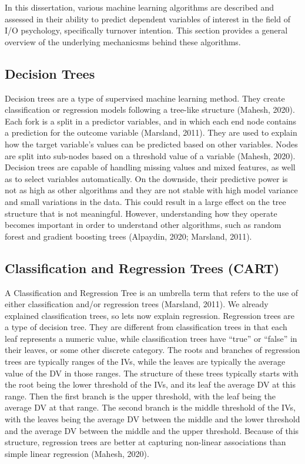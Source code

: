 \documentclass[
  man]{apa7}
\begin{document}
In this dissertation, various machine learning algorithms are described and assessed in their ability to predict dependent variables of interest in the field of I/O psychology, specifically turnover intention.
This section provides a general overview of the underlying mechanicsms behind these algorithms.

\hypertarget{decision-trees}{%
\subsection{Decision Trees}\label{decision-trees}}

Decision trees are a type of supervised machine learning method.
They create classification or regression models following a tree-like structure (Mahesh, 2020).
Each fork is a split in a predictor variables, and in which each end node contains a prediction for the outcome variable (Marsland, 2011).
They are used to explain how the target variable's values can be predicted based on other variables.
Nodes are split into sub-nodes based on a threshold value of a variable (Mahesh, 2020).
Decision trees are capable of handling missing values and mixed features, as well as to select variables automatically.
On the downside, their predictive power is not as high as other algorithms and they are not stable with high model variance and small variations in the data.
This could result in a large effect on the tree structure that is not meaningful.
However, understanding how they operate becomes important in order to understand other algorithms, such as random forest and gradient boosting trees (Alpaydin, 2020; Marsland, 2011).

\hypertarget{classification-and-regression-trees-cart}{%
\subsection{Classification and Regression Trees (CART)}\label{classification-and-regression-trees-cart}}

A Classification and Regression Tree is an umbrella term that refers to the use of either classification and/or regression trees (Marsland, 2011).
We already explained classification trees, so lets now explain regression.
Regression trees are a type of decision tree.
They are different from classification trees in that each leaf represents a numeric value, while classification trees have ``true'' or ``false'' in their leaves, or some other discrete category.
The roots and branches of regression trees are typically ranges of the IVs, while the leaves are typically the average value of the DV in those ranges.
The structure of these trees typically starts with the root being the lower threshold of the IVs, and its leaf the average DV at this range.
Then the first branch is the upper threshold, with the leaf being the average DV at that range.
The second branch is the middle threshold of the IVs, with the leaves being the average DV between the middle and the lower threshold and the average DV between the middle and the upper threshold.
Because of this structure, regression trees are better at capturing non-linear associations than simple linear regression (Mahesh, 2020).
\end{document}
